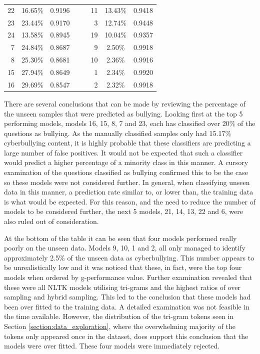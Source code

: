 \begin{table}[h]
\begin{tabular}{rccrlrcc}
	22 & 16.65\% & 0.9196 &  &  & 11 & 13.43\% & 0.9418 \\
	23 & 23.44\% & 0.9170 &  &  & 3 & 12.74\% & 0.9448 \\
	24 & 13.58\% & 0.8945 &  &  & 19 & 10.04\% & 0.9357 \\
	7 & 24.84\% & 0.8687 &  &  & 9 & 2.50\% & 0.9918 \\
	8 & 25.30\% & 0.8681 &  &  & 10 & 2.36\% & 0.9916 \\
	15 & 27.94\% & 0.8649 &  &  & 1 & 2.34\% & 0.9920 \\
	16 & 29.69\% & 0.8547 &  &  & 2 & 2.32\% & 0.9918 \\    
	\bottomrule
    \end{tabular}
\end{table}

There are several conclusions that can be made by reviewing the percentage of the unseen samples that were predicted as bullying. Looking first at the top 5 performing models, models 16, 15, 8, 7 and 23, each has classified over 20\% of the questions as bullying. As the manually classified samples only had 15.17\% cyberbullying content, it is highly probable that these classifiers are predicting a large number of false positives. It would not be expected that such a classifier would predict a higher percentage of a minority class in this manner. A cursory examination of the questions classified as bullying confirmed this to be the case so these models were not considered further. In general, when classifying unseen data in this manner, a prediction rate similar to, or lower than, the training data is what would be expected. For this reason, and the need to reduce the number of models to be considered further, the next 5 models, 21, 14, 13, 22 and 6, were also ruled out of consideration.

At the bottom of the table it can be seen that four models performed really poorly on the unseen data. Models 9, 10, 1 and 2, all only managed to identify approximately 2.5\% of the unseen data as cyberbullying. This number appears to be unrealistically low and it was noticed that these, in fact, were the top four models when ordered by g-performance value. Further examination revealed that these were all NLTK models utilising tri-grams and the highest ratios of over sampling and hybrid sampling. This led to the conclusion that these models had been over fitted to the training data. A detailed examination was not feasible in the time available. However, the distribution of the tri-gram tokens seen in Section \ref{section:data_exploration}, where the overwhelming majority of the tokens only appeared once in the dataset, does support this conclusion that the models were over fitted. These four models were immediately rejected.


